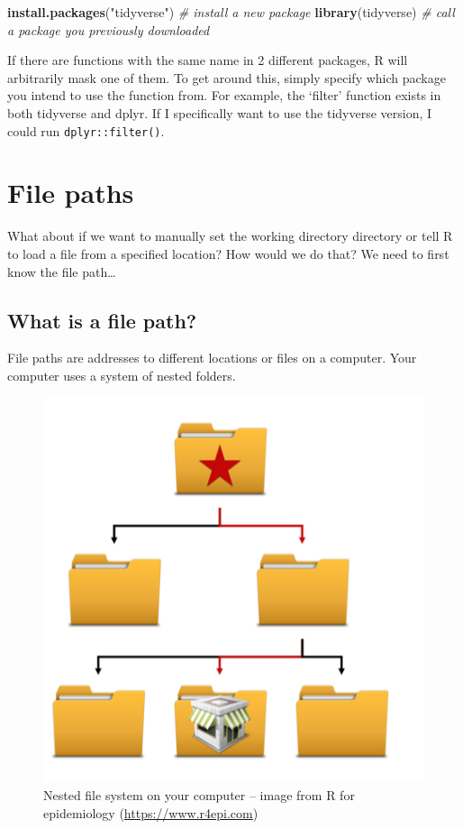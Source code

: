 \documentclass[
]{book}
\newenvironment{Shaded}{\begin{snugshade}}{\end{snugshade}}
\newcommand{\CommentTok}[1]{\textcolor[rgb]{0.56,0.35,0.01}{\textit{#1}}}
\newcommand{\FunctionTok}[1]{\textcolor[rgb]{0.13,0.29,0.53}{\textbf{#1}}}
\newcommand{\NormalTok}[1]{#1}
\newcommand{\StringTok}[1]{\textcolor[rgb]{0.31,0.60,0.02}{#1}}
\begin{document}
\begin{Shaded}
\begin{Highlighting}[]
\FunctionTok{install.packages}\NormalTok{(}\StringTok{"tidyverse"}\NormalTok{) }\CommentTok{\# install a new package}
\FunctionTok{library}\NormalTok{(tidyverse) }\CommentTok{\# call a package you previously downloaded}
\end{Highlighting}
\end{Shaded}

If there are functions with the same name in 2 different packages, R will
arbitrarily mask one of them. To get around this, simply specify which package
you intend to use the function from. For example, the `filter' function exists in both tidyverse and dplyr. If I specifically want to use the tidyverse version, I could run \texttt{dplyr::filter()}.

\chapter{File paths}\label{FilePaths}

What about if we want to manually set the working directory directory or tell R to load a file from a specified location? How would we do that? We need to first know the file path\ldots{}

\section{What is a file path?}\label{what-is-a-file-path}

File paths are addresses to different locations or files on a computer. Your computer uses a system of nested folders.

\begin{figure}
\centering
\includegraphics[width=0.4\linewidth,height=\textheight,keepaspectratio]{./docs/files/file_path_hierarchy.png}
\caption{Nested file system on your computer -- image from R for epidemiology (\url{https://www.r4epi.com})}
\end{figure}
\end{document}
